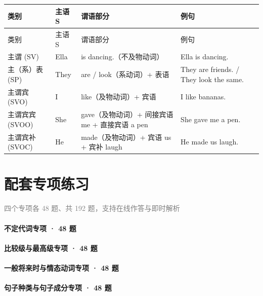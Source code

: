 \documentclass[11pt,a4paper]{ctexart}
\begin{document}
{\footnotesize
\begin{longtable}{p{3.35cm}p{3.35cm}p{3.35cm}p{3.35cm}}
\hline
类别 & 主语 S & 谓语部分 & 例句 \\
\hline
\endfirsthead
\hline
类别 & 主语 S & 谓语部分 & 例句 \\
\hline
\endhead
\hline
\endfoot
主谓 (SV) & Ella & is dancing.（不及物动词） & Ella is dancing. \\
主（系）表 (SP) & They & are / look（系动词）+ 表语 & They are friends. / They look the same. \\
主谓宾 (SVO) & I & like（及物动词）+ 宾语 & I like bananas. \\
主谓宾宾 (SVOO) & She & gave（及物动词）+ 间接宾语 me + 直接宾语 a pen & She gave me a pen. \\
主谓宾补 (SVOC) & He & made（及物动词）+ 宾语 us + 宾补 laugh & He made us laugh. \\
\end{longtable}
}

\begin{center}\end{center}

\section{配套专项练习}
\noindent\textcolor{gray}{四个专项各 48 题、共 192 题，支持在线作答与即时解析}\par\smallskip
\paragraph{不定代词专项 · 48 题}

\paragraph{比较级与最高级专项 · 48 题}

\paragraph{一般将来时与情态动词专项 · 48 题}

\paragraph{句子种类与句子成分专项 · 48 题}

\begin{center}\end{center}
\end{document}
